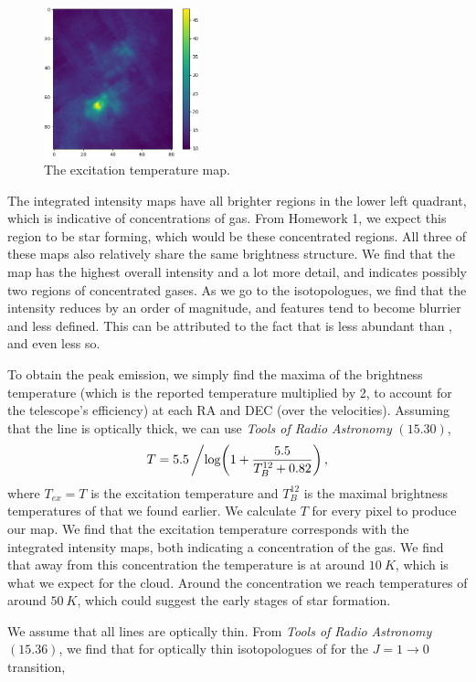 \documentclass[11pt]{article}
\newenvironment{tight_enumerate}{
\begin{enumerate}[label=(\alph*)]
\setlength{\itemsep}{3pt}
\setlength{\parskip}{0pt}
}{\end{enumerate}}
\begin{document}
\begin{tight_enumerate}
\begin{multicols}{2}
\begin{figure}[H]
\centering
\includegraphics[width=0.4\textwidth]{temp.png}
\caption*{The excitation temperature map.}
\end{figure}
\end{multicols}
The integrated intensity maps have all brighter regions in the lower left quadrant, which is indicative of concentrations of gas. From Homework 1, we expect this region to be star forming, which would be these concentrated regions. All three of these maps also relatively share the same brightness structure. We find that the  map has the highest overall intensity and a lot more detail, and indicates possibly two regions of concentrated gases. As we go to the isotopologues, we find that the intensity reduces by an order of magnitude, and features tend to become blurrier and less defined. This can be attributed to the fact that  is less abundant than , and  even less so. 
\newpage
\item To obtain the peak emission, we simply find the maxima of the brightness temperature (which is the reported temperature multiplied by 2, to account for the telescope's efficiency) at each RA and DEC (over the velocities). Assuming that the  line is optically thick, we can use \textit{Tools of Radio Astronomy} $(15.30)$, 
\[T = 5.5\left/\log\middle(1+\frac{5.5}{T_{B}^{12}+0.82}\right),\]
where $T_{ex} = T$ is the excitation temperature and $T_{B}^{12}$ is the maximal brightness temperatures of that we found earlier. We calculate $T$ for every pixel to produce our map. We find that the excitation temperature corresponds with the integrated intensity maps, both indicating a concentration of the gas. We find that away from this concentration the temperature is at around $10\ \si{K}$, which is what we expect for the cloud. Around the concentration we reach temperatures of around $50\ \si{K}$, which could suggest the early stages of star formation.
\item We assume that all lines are optically thin. From \textit{Tools of Radio Astronomy} $(15.36)$, we find that for optically thin isotopologues of  for the $J = 1 \rightarrow 0$ transition,

\end{tight_enumerate}
\end{document}
